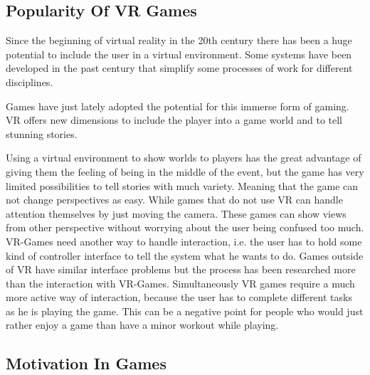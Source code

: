 \subsection{Popularity Of VR Games}
Since the beginning of virtual reality in the 20th century there has been a huge potential to include the user in a virtual environment. Some systems have been developed in the past century that simplify some processes of work for different disciplines. 

Games have just lately adopted the potential for this immerse form of gaming. VR offers new dimensions to include the player into a game world and to tell stunning stories.

Using a virtual environment to show worlds to players has the great advantage of giving them the feeling of being in the middle of the event, but the game has very limited possibilities to tell stories with much variety. Meaning that the game can not change perspectives as easy. While games that do not use VR can handle attention themselves by just moving the camera. These games can show views from other perspective without worrying about the user being confused too much. VR-Games need another way to handle interaction, i.e. the user has to hold some kind of controller interface to tell the system what he wants to do. Games outside of VR have similar interface problems but the process has been researched more than the interaction with VR-Games. Simultaneously VR games require a much more active way of interaction, because the user has to complete different tasks as he is playing the game. This can be a negative point for people who would just rather enjoy a game than have a minor workout while playing.
%			
%
%
%

\subsection{Motivation In Games}


